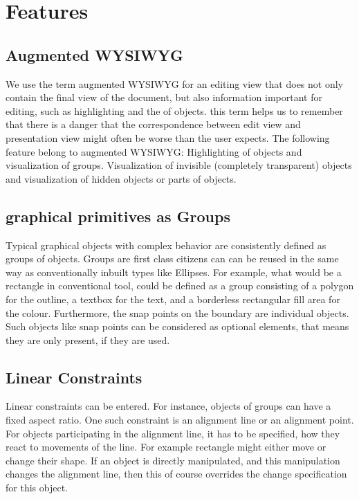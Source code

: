 \documentclass{sig-alternate}
\begin{document}
\section{Features}

\subsection{Augmented WYSIWYG}
We use the term augmented WYSIWYG for an editing view that does not only contain the final view of the document, but also information important for editing, such as highlighting and the  of objects. this term helps us to remember that there is a danger that the correspondence between edit view and presentation view might often be worse than  the user expects.
The following feature belong to augmented WYSIWYG: 
Highlighting of objects and visualization of groups. Visualization of invisible (completely transparent) objects and visualization of hidden objects or parts of objects.

\subsection{graphical primitives as Groups}


Typical graphical objects with complex behavior are consistently defined as groups of objects. Groups are first class citizens can can be reused in the same way as conventionally inbuilt types like Ellipses.
For example, what would be a rectangle in conventional tool, could be defined as a group consisting of a polygon for the outline, a textbox for the text, and a borderless rectangular fill area for the colour. Furthermore, the snap points on the boundary are individual objects.  Such objects like snap points can be considered as optional elements, that means they are only present, if they are used.

\subsection{Linear Constraints}
Linear constraints can be entered.
For instance, objects of groups can have a fixed aspect ratio. 
One such constraint is an alignment line or an alignment point. 
For objects participating in the alignment line, it has to be specified, how they react to movements of the line. For example rectangle might either move or change their shape. If an object is directly manipulated, and this manipulation changes the alignment line, then this of course overrides the change specification for this object. 
\end{document}
